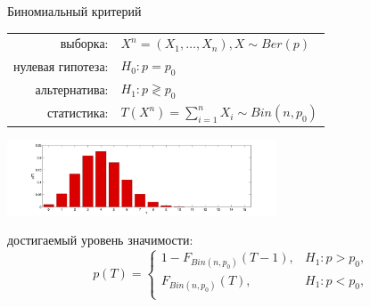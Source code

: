 \documentclass[11pt,pdf,utf8,hyperref={unicode},aspectratio=169]{beamer}
\begin{document}
\begin{frame}{Биномиальный критерий}
	\begin{center}
		\begin{tabular}{rl}
			выборка:                        & $X^{n}=\left(X_{1},\ldots,X_{n}\right), X \sim Ber\left(p\right)$ \\
			нулевая гипотеза:               & $H_0\colon p=p_0$ \\
			альтернатива:                   & $H_1\colon p \gtrless p_0$ \\
			статистика:                     & $T\left(X^{n}\right) = \sum\limits_{i=1}^n X_i \sim Bin(n,p_0)$ \\
		\end{tabular}
		\includegraphics[width=0.6\textwidth]{bin_nonsym.png}
	\end{center}

	\vspace{-5pt}
	достигаемый уровень значимости:
	$$p\left(T\right) = \begin{cases}
	1-F_{Bin(n,p_0)}(T-1), & H_1 \colon p>p_0, \\
	F_{Bin(n,p_0)}(T),   & H_1 \colon p<p_0, \\
	\end{cases}
	$$

\end{frame}
\end{document}
